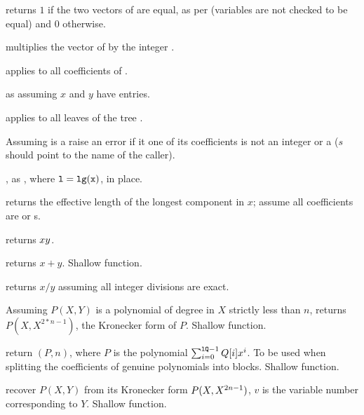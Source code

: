 
 returns $1$ if the two vectors of 
are equal, as per  (variables are not checked to be equal) and
$0$ otherwise.

 multiplies the vector of  
by the integer .

 applies  to all
coefficients of .

 as  assuming $x$
and $y$ have  entries.


 applies  to all
leaves of the tree .


 Assuming  is a 
raise an error if it one of its coefficients is not an integer or a 
($s$ should point to the name of the caller).

, as , where
${\tt l} = {\tt lg(x)}$, in place.

 returns the effective length of the longest
component in $x$; assume all coefficients are  or s.

 returns $x\*y$.

 returns $x+y$. Shallow function.

 returns $x/y$ assuming all integer
divisions are exact.

 Assuming $P(X,Y)$ is a polynomial
of degree in $X$ strictly less than $n$, returns $P(X,X^{2*n-1})$, the
Kronecker form of $P$. Shallow function.

 return
$(P, n)$, where $P$ is the polynomial
$\sum_{i = 0}^{{\tt lQ} - 1} Q[i] x^i$. To be used when splitting
the coefficients of genuine polynomials into blocks. Shallow function.

 recover $P(X,Y)$
from its Kronecker form $P(X,X^{2\*n-1})$, $v$ is the variable number
corresponding to $Y$. Shallow function.

